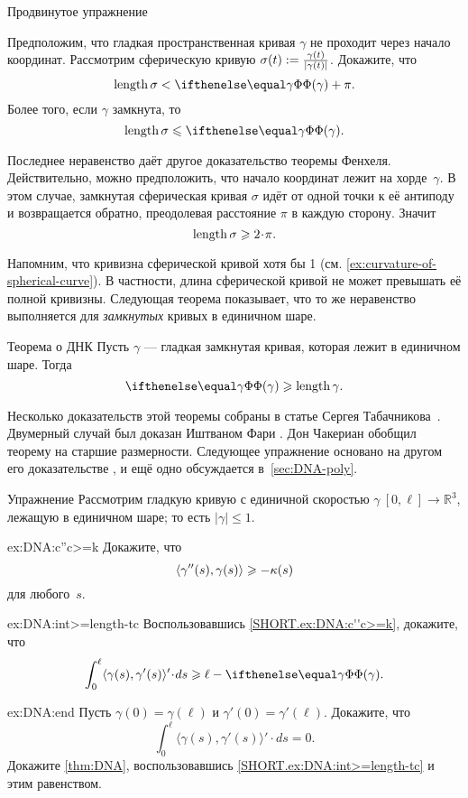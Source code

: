 \begin{thm}{Продвинутое упражнение}\label{ex:gamma/|gamma|}
{\sloppy
Предположим, что гладкая пространственная кривая $\gamma$ не проходит через начало координат.
Рассмотрим сферическую кривую $\sigma(t)\z\df\frac{\gamma(t)}{|\gamma(t)|}$.
Докажите, что
\[\length \sigma< \tc\gamma+\pi.\]
Более того, если $\gamma$ замкнута, то
\[\length \sigma\le \tc\gamma.\]

}
\end{thm}

Последнее неравенство даёт другое доказательство теоремы Фенхеля.
Действительно, можно предположить, что начало координат лежит на хорде~$\gamma$.
В этом случае, замкнутая сферическая кривая $\sigma$ идёт от одной точки к её антиподу и возвращается обратно,
преодолевая расстояние $\pi$ в каждую сторону.
Значит
\[\length\sigma\ge 2\cdot\pi.\]

Напомним, что кривизна сферической кривой хотя бы 1
(см. \ref{ex:curvature-of-spherical-curve}).
В частности, длина сферической кривой не может превышать её полной кривизны.
Следующая теорема показывает, что то же неравенство выполняется для \textit{замкнутых} кривых в единичном шаре.

\begin{thm}{Теорема о ДНК}\label{thm:DNA}
Пусть $\gamma$ --- гладкая замкнутая кривая, которая лежит в единичном шаре.
Тогда
\[\tc\gamma\ge \length\gamma.\]

\end{thm}

Несколько доказательств этой теоремы собраны в статье Сергея Табачникова~\cite{tabachnikov}.
Двумерный случай был доказан Иштваном Фари \cite{fary1950}.
Дон Чакериан \cite{chakerian1962} обобщил теорему на старшие размерности.
Следующее упражнение основано на другом его доказательстве \cite{chakerian1964},
и ещё одно обсуждается в~\ref{sec:DNA-poly}.

\begin{thm}{Упражнение}\label{ex:DNA}
Рассмотрим гладкую кривую с единичной скоростью $\gamma\:[0,\ell]\to\mathbb{R}^3$, лежащую в единичном шаре; то есть $|\gamma|\le 1$.

\begin{subthm}{ex:DNA:c''c>=k}
Докажите, что
\[\langle\gamma''(s),\gamma(s)\rangle\geqslant-\kappa(s)\]
для любого~$s$.
\end{subthm}

\begin{subthm}{ex:DNA:int>=length-tc}
Воспользовавшись \ref{SHORT.ex:DNA:c''c>=k}, докажите, что
\[\int_0^\ell\langle\gamma(s),\gamma'(s)\rangle'\cdot ds\ge
\ell-\tc\gamma.\]

\end{subthm}

\begin{subthm}{ex:DNA:end}
Пусть $\gamma(0)=\gamma(\ell)$ и $\gamma'(0)=\gamma'(\ell)$.
Докажите, что
\[\int_0^\ell\langle\gamma(s),\gamma'(s)\rangle'\cdot ds=0.\]
Докажите \ref{thm:DNA}, воспользовавшись \ref{SHORT.ex:DNA:int>=length-tc} и этим равенством.
\end{subthm}
\end{thm}


